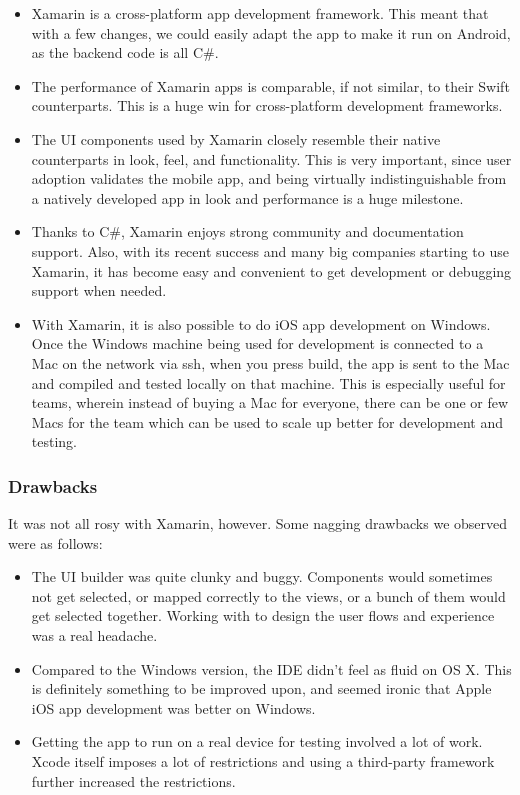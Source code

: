 \documentclass[12pt,a4paper]{article}
\begin{document}
	\begin{itemize}
	    \item Xamarin is a cross-platform app development framework. This meant that with a few changes, we could easily adapt the app to make it run on Android, as the backend code is all C\#.
	    \item The performance of Xamarin apps is comparable, if not similar, to their Swift counterparts. This is a huge win for cross-platform development frameworks.
	    \item The UI components used by Xamarin closely resemble their native counterparts in look, feel, and functionality. This is very important, since user adoption validates the mobile app, and being virtually indistinguishable from a natively developed app in look and performance is a huge milestone.
	    
	    \item Thanks to C\#, Xamarin enjoys strong community and documentation support. Also, with its recent success and many big companies starting to use Xamarin, it has become easy and convenient to get development or debugging support when needed.
	    \item With Xamarin, it is also possible to do iOS app development on Windows. Once the Windows machine being used for development is connected to a Mac on the network via ssh, when you press build, the app is sent to the Mac and compiled and tested locally on that machine. This is especially useful for teams, wherein instead of buying a Mac for everyone, there can be one or few Macs for the team which can be used to scale up better for development and testing.
	\end{itemize}
	
	\subsubsection{Drawbacks}
	
	It was not all rosy with Xamarin, however. Some nagging drawbacks we observed were as follows:
	
	\begin{itemize}
	    \item The UI builder was quite clunky and buggy. Components would sometimes not get selected, or mapped correctly to the views, or a bunch of them would get selected together. Working with to design the user flows and experience was a real headache.
	    \item Compared to the Windows version, the IDE didn't feel as fluid on OS X. This is definitely something to be improved upon, and seemed ironic that Apple iOS app development was better on Windows.
	    \item Getting the app to run on a real device for testing involved a lot of work. Xcode itself imposes a lot of restrictions and using a third-party framework further increased the restrictions. 
	\end{itemize}
	
\end{document}
